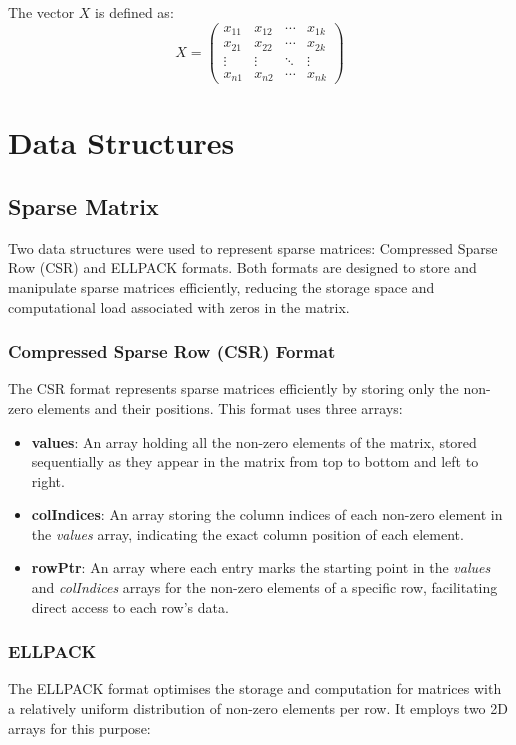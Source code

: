 \documentclass[12pt,oneside]{book} %
\begin{document}
The vector $X$ is defined as:
\begin{equation}
    X = \begin{pmatrix}
        x_{11} & x_{12} & \cdots & x_{1k} \\
        x_{21} & x_{22} & \cdots & x_{2k} \\
        \vdots & \vdots & \ddots & \vdots \\
        x_{n1} & x_{n2} & \cdots & x_{nk}
    \end{pmatrix}\label{eq:fat-vector}
\end{equation}

\section{Data Structures}

\subsection{Sparse Matrix}
Two data structures were used to represent sparse matrices: Compressed Sparse
Row (CSR) and ELLPACK formats. Both formats are designed to store and
manipulate sparse matrices efficiently, reducing the storage space and
computational load associated with zeros in the matrix.

\subsubsection{Compressed Sparse Row (CSR) Format}
The CSR format represents sparse matrices efficiently by storing only the
non-zero elements and their positions. This format uses three arrays:

\begin{itemize}
    \item \textbf{values}: An array holding all the non-zero elements of the matrix, stored sequentially as they appear in the matrix from top to bottom and left to right.
    \item \textbf{colIndices}: An array storing the column indices of each non-zero element in the \textit{values} array, indicating the exact column position of each element.
    \item \textbf{rowPtr}: An array where each entry marks the starting point in the \textit{values} and \textit{colIndices} arrays for the non-zero elements of a specific row, facilitating direct access to each row's data.
\end{itemize}

\subsubsection{ELLPACK }
The ELLPACK format optimises the storage and computation for matrices with a
relatively uniform distribution of non-zero elements per row. It employs two 2D
arrays for this purpose:
\end{document}
